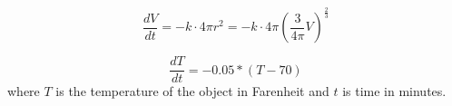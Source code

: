 \documentclass[../../diff_eqs.tex]{subfiles}
\begin{document}
\begin{exercise}{18}
    $$\frac{dV}{dt} = -k \cdot 4\pi r^2 = -k \cdot 4\pi \left(\frac{3}{4\pi}V\right)^{\frac{2}{3}}$$
\end{exercise}

\begin{exercise}{19}
    $$\frac{dT}{dt} = -0.05*(T - 70)$$ where $T$ is the temperature of the object in Farenheit and $t$ is time in minutes.
\end{exercise}
    
\end{document}
